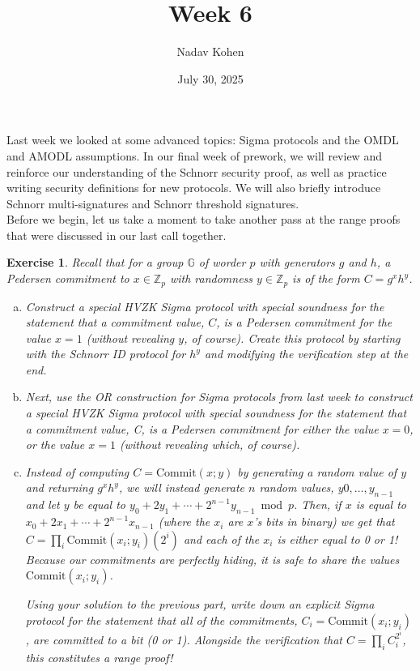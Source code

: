 \documentclass[12pt]{article}
\newcommand{\Z}[0]{\mathbb{Z}}
\newcommand{\G}[0]{\mathbb{G}}
\newtheorem{exercise}{Exercise}
\theoremstyle{definition}
\theoremstyle{remark}
\theoremstyle{definition}
\begin{document}
\title{Week 6}
\author{Nadav Kohen}
\date{July 30, 2025}
\maketitle

Last week we looked at some advanced topics: Sigma protocols and the OMDL and AMODL assumptions. In our final week of prework, we will review and reinforce our understanding of the Schnorr security proof, as well as practice writing security definitions for new protocols. We will also briefly introduce Schnorr multi-signatures and Schnorr threshold signatures.\\

Before we begin, let us take a moment to take another pass at the range proofs that were discussed in our last call together.

\begin{exercise} Recall that for a group $\G$ of worder $p$ with generators  $g$ and $h$, a Pedersen commitment to $x\in\Z_p$ with randomness $y\in\Z_p$ is of the form $C = g^xh^y$.
\begin{enumerate}[(a)]
\item Construct a special HVZK Sigma protocol with special soundness for the statement that a commitment value, $C$, is a Pedersen commitment for the value $x = 1$ (without revealing $y$, of course). Create this protocol by starting with the Schnorr ID protocol for $h^y$ and modifying the verification step at the end.
\item Next, use the OR construction for Sigma protocols from last week to construct a special HVZK Sigma protocol with special soundness for the statement that a commitment value, C, is a Pedersen commitment for either the value $x = 0$, or the value $x = 1$ (without revealing which, of course).
\item Instead of computing $C = \text{Commit}(x; y)$ by generating a random value of $y$ and returning $g^xh^y$, we will instead generate $n$ random values, $y0, \ldots, y_{n-1}$ and let $y$ be equal to $y_0 + 2y_1 + \cdots + 2^{n-1}y_{n-1}\bmod p$. Then, if $x$ is equal to $x_0 + 2x_1 + \cdots + 2^{n-1}x_{n-1}$ (where the $x_i$ are $x$’s bits in binary) we get that $C = \prod_i \text{Commit}(x_i; y_i)(2^i)$ and each of the $x_i$ is either equal to 0 or 1! Because our commitments are perfectly hiding, it is safe to share the values $\text{Commit}(x_i; y_i)$.

Using your solution to the previous part, write down an explicit Sigma protocol for the statement that all of the commitments, $C_i = \text{Commit}(x_i; y_i)$, are committed to a bit (0 or 1). Alongside the verification that $C = \prod_i C_i^{2^i}$, this constitutes a range proof!
\end{enumerate}
\end{exercise}
\end{document}
